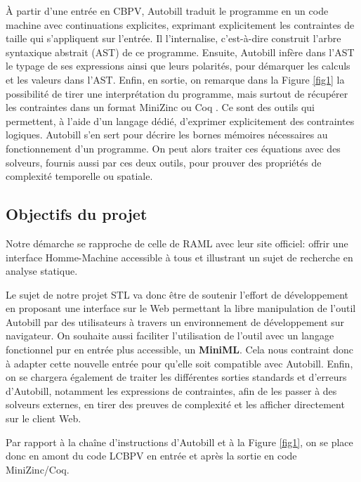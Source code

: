 \documentclass[12pt]{article}
\begin{document}
À partir d'une entrée en CBPV, Autobill traduit le programme en un code
machine avec continuations explicites, exprimant explicitement les
contraintes de taille qui s'appliquent sur l'entrée. Il l'internalise,
c'est-à-dire construit l'arbre syntaxique abstrait (AST) de ce
programme. Ensuite, Autobill infère dans l'AST le typage de ses
expressions ainsi que leurs polarités, pour démarquer les calculs et les
valeurs dans l'AST. Enfin, en sortie, on remarque dans la Figure
\ref{fig1} la possibilité de tirer une interprétation du programme, mais
surtout de récupérer les contraintes dans un format MiniZinc
\cite{minizinc} ou Coq
\cite{coq}. Ce sont des outils qui permettent, à l'aide d'un langage dédié, d'exprimer
explicitement des contraintes logiques. Autobill s'en sert pour décrire
les bornes mémoires nécessaires au fonctionnement d'un programme. On
peut alors traiter ces équations avec des solveurs, fournis aussi par
ces deux outils, pour prouver des propriétés de complexité temporelle ou
spatiale.

\newpage

\subsection{Objectifs du projet}\label{objectifs-du-projet}

Notre démarche se rapproche de celle de RAML
\cite{RAML} avec leur site officiel: offrir
une interface Homme-Machine accessible à tous et illustrant un sujet de
recherche en analyse statique.

Le sujet de notre projet STL va donc être de soutenir l'effort de
développement en proposant une interface sur le Web permettant la libre
manipulation de l'outil Autobill par des utilisateurs à travers un
environnement de développement sur navigateur. On souhaite
aussi faciliter l'utilisation de l'outil avec un langage fonctionnel pur
en entrée plus accessible, un \textbf{MiniML}. Cela nous contraint donc
à adapter cette nouvelle entrée pour qu'elle soit compatible avec
Autobill. Enfin, on se chargera également de traiter les différentes sorties
standards et d'erreurs d'Autobill, notamment les expressions de
contraintes, afin de les passer à des solveurs externes, en tirer des
preuves de complexité et les afficher directement sur le client Web.

Par rapport à la chaîne d'instructions d'Autobill et à la Figure
\ref{fig1}, on se place donc en amont du code LCBPV en entrée et après
la sortie en code MiniZinc/Coq.
\end{document}
